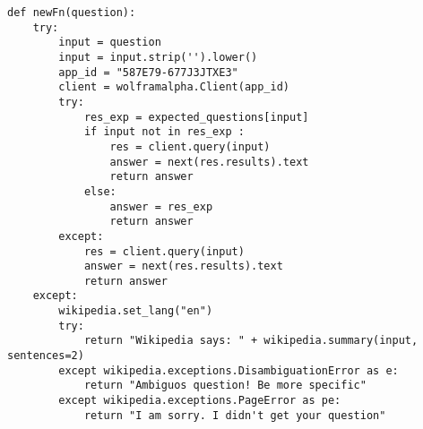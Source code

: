 \begin{lstlisting}
def newFn(question):
	try:
		input = question
		input = input.strip('').lower() 
		app_id = "587E79-677J3JTXE3"
		client = wolframalpha.Client(app_id)
		try:
			res_exp = expected_questions[input]
			if input not in res_exp :
				res = client.query(input)
				answer = next(res.results).text
				return answer
			else:
				answer = res_exp
				return answer
		except:
			res = client.query(input)
			answer = next(res.results).text
			return answer
	except:
		wikipedia.set_lang("en")
		try:
			return "Wikipedia says: " + wikipedia.summary(input, sentences=2)
		except wikipedia.exceptions.DisambiguationError as e:
			return "Ambiguos question! Be more specific"
		except wikipedia.exceptions.PageError as pe:
			return "I am sorry. I didn't get your question"
\end{lstlisting}